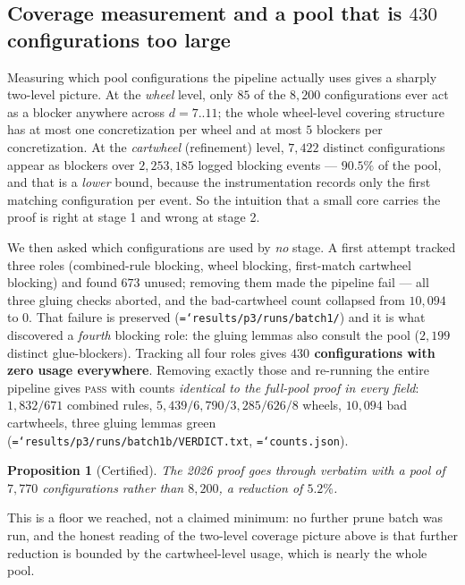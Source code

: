 \documentclass[11pt]{article}
\newtheorem{proposition}[theorem]{Proposition}
\theoremstyle{definition}
\newcommand{\art}[1]{{\texttt{\hyphenchar\font=`\-\relax #1}}}
\begin{document}
\subsection{Coverage measurement and a pool that is $430$ configurations too large}

Measuring which pool configurations the pipeline actually uses gives a sharply
two-level picture. At the \emph{wheel} level, only $85$ of the $8{,}200$
configurations ever act as a blocker anywhere across $d=7..11$; the whole wheel-level
covering structure has at most one concretization per wheel and at most $5$ blockers
per concretization. At the \emph{cartwheel} (refinement) level, $7{,}422$ distinct
configurations appear as blockers over $2{,}253{,}185$ logged blocking events ---
$90.5\%$ of the pool, and that is a \emph{lower} bound, because the instrumentation
records only the first matching configuration per event. So the intuition that a
small core carries the proof is right at stage 1 and wrong at stage 2.

We then asked which configurations are used by \emph{no} stage. A first attempt
tracked three roles (combined-rule blocking, wheel blocking, first-match cartwheel
blocking) and found $673$ unused; removing them made the pipeline fail --- all three
gluing checks aborted, and the bad-cartwheel count collapsed from $10{,}094$ to $0$.
That failure is preserved (\art{results/p3/runs/batch1/}) and it is what discovered
a \emph{fourth} blocking role: the gluing lemmas also consult the pool ($2{,}199$
distinct glue-blockers). Tracking all four roles gives \textbf{$430$ configurations
with zero usage everywhere}. Removing exactly those and re-running the entire
pipeline gives \textsc{pass} with counts \emph{identical to the full-pool proof in
every field}: $1{,}832/671$ combined rules, $5{,}439/6{,}790/3{,}285/626/8$ wheels,
$10{,}094$ bad cartwheels, three gluing lemmas green
(\art{results/p3/runs/batch1b/VERDICT.txt}, \art{counts.json}).

\begin{proposition}[Certified]
The 2026 proof goes through verbatim with a pool of $7{,}770$ configurations rather
than $8{,}200$, a reduction of $5.2\%$.
\end{proposition}

This is a floor we reached, not a claimed minimum: no further prune batch was run,
and the honest reading of the two-level coverage picture above is that further
reduction is bounded by the cartwheel-level usage, which is nearly the whole pool.
\end{document}
